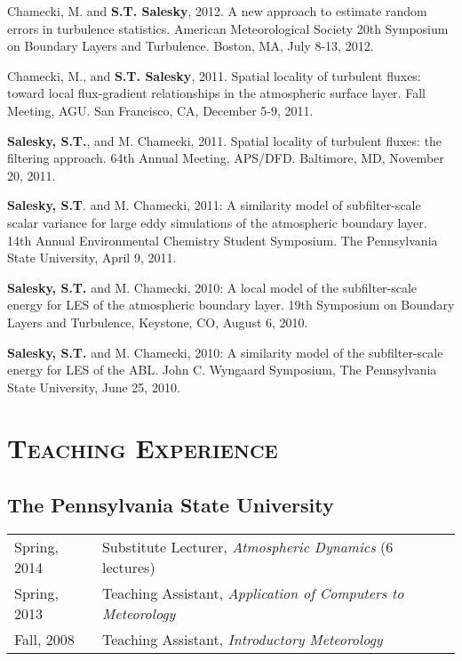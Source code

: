 \documentclass[11pt,letterpaper]{article}
\begin{document}
Chamecki, M. and \textbf{S.T. Salesky}, 2012. A new approach to estimate random errors in turbulence statistics. American Meteorological Society 20th Symposium on Boundary Layers and Turbulence. Boston, MA, July 8-13, 2012. 

Chamecki, M., and \textbf{S.T. Salesky}, 2011. Spatial locality of turbulent fluxes: toward local flux-gradient relationships in the atmospheric surface layer. Fall Meeting, AGU. San Francisco, CA, December 5-9, 2011. 

\textbf{Salesky, S.T.}, and M. Chamecki, 2011. Spatial locality of turbulent fluxes: the filtering approach. 64th Annual Meeting, APS/DFD. Baltimore, MD, November 20, 2011. 

\textbf{Salesky, S.T}. and M. Chamecki, 2011: A similarity model of subfilter-scale scalar variance for large eddy simulations of the atmospheric boundary layer. 14th Annual Environmental Chemistry Student Symposium. The Pennsylvania State University, April 9, 2011. 

\textbf{Salesky, S.T.} and M. Chamecki, 2010: A local model of the subfilter-scale energy for LES of the atmospheric boundary layer. 19th Symposium on Boundary Layers and Turbulence, Keystone, CO, August 6, 2010. 

\textbf{Salesky, S.T.} and M. Chamecki, 2010: A similarity model of the subfilter-scale energy for LES of the ABL. John C. Wyngaard Symposium, The Pennsylvania State University, June 25, 2010. 

\section*{\textsc{Teaching Experience}} 
\subsection*{The Pennsylvania State University}

\begin{tabular}{l l}
Spring, 2014 & Substitute Lecturer, \textit{Atmospheric Dynamics} (6 lectures) \\
Spring, 2013 & Teaching Assistant, \textit{Application of Computers to Meteorology} \\
Fall, 2008 & Teaching Assistant, \textit{Introductory Meteorology} \\
\end{tabular}
\end{document}
